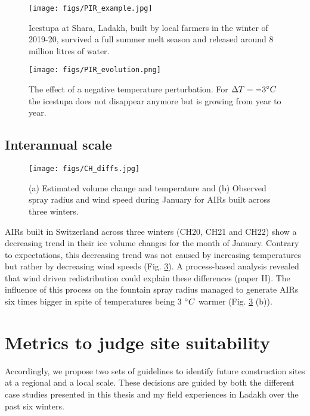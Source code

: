 \begin{figure}[htb]
  \centering
	\texttt{[image: figs/PIR\_example.jpg]}

  \caption{Icestupa at Shara, Ladakh, built by local farmers in the winter of 2019-20, survived a full summer melt season and released
  around 8 million litres of water.} 

\label{fig:PIR} 
\end{figure}

\begin{figure}[htb]
  \centering
	\texttt{[image: figs/PIR\_evolution.png]}
  \caption{The effect of a negative temperature perturbation. For $\Delta T = -3 ^{\circ} C$ the icestupa does
  not disappear anymore but is growing from year to year.}
\label{fig:PIR_evolution}
\end{figure}



\subsection{Interannual scale}
\label{sec:interannual}

\begin{figure}[htb]
\centering
\texttt{[image: figs/CH\_diffs.jpg]}
\caption{(a) Estimated volume change and temperature and (b) Observed spray radius and wind speed
during January for \ac{AIRs} built across three winters. } 
\label{fig:CH_diffs}
\end{figure}

\ac{AIRs} built in Switzerland across three winters (CH20, CH21 and CH22) show a decreasing trend in their ice volume
changes for the month of January. Contrary to expectations, this decreasing trend was not caused by increasing
temperatures but rather by decreasing wind speeds (Fig. \ref{fig:CH_diffs}). A process-based analysis revealed
that wind driven redistribution could explain these differences (paper II). The influence of this process on
the fountain spray radius managed to generate \ac{AIRs} six times bigger in spite of temperatures being 3 $^{\circ} C$
warmer (Fig. \ref{fig:CH_diffs} (b)). 



\section{Metrics to judge site suitability}

Accordingly, we propose two sets of guidelines to identify future construction sites at a regional and a local
scale. These decisions are guided by both the different case studies presented in this thesis and my field
experiences in Ladakh over the past six winters.


